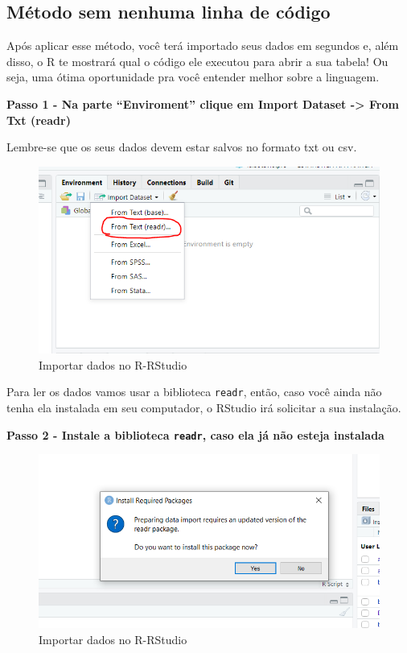 \documentclass[
]{book}
\begin{document}
\hypertarget{muxe9todo-sem-nenhuma-linha-de-cuxf3digo}{%
\subsection{Método sem nenhuma linha de
código}\label{muxe9todo-sem-nenhuma-linha-de-cuxf3digo}}

Após aplicar esse método, você terá importado seus dados em segundos e,
além disso, o R te mostrará qual o código ele executou para abrir a sua
tabela! Ou seja, uma ótima oportunidade pra você entender melhor sobre a
linguagem.

\textbf{Passo 1 - Na parte ``Enviroment'' clique em Import Dataset
-\textgreater{} From Txt (readr)}

Lembre-se que os seus dados devem estar salvos no formato txt ou csv.

\begin{figure}
\centering
\includegraphics{imagens/5_importacao1.png}
\caption{Importar dados no R-RStudio}
\end{figure}

Para ler os dados vamos usar a biblioteca \texttt{readr}, então, caso
você ainda não tenha ela instalada em seu computador, o RStudio irá
solicitar a sua instalação.

\textbf{Passo 2 - Instale a biblioteca \texttt{readr}, caso ela já não
esteja instalada}

\begin{figure}
\centering
\includegraphics{imagens/5_importacao2.png}
\caption{Importar dados no R-RStudio}
\end{figure}
\end{document}
